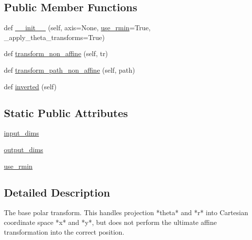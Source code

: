 \subsection*{Public Member Functions}
\begin{DoxyCompactItemize}
\item 
def \hyperlink{classmatplotlib_1_1projections_1_1polar_1_1PolarTransform_aefebf19fe00b3fc0c0427c3a461b0e89}{\+\_\+\+\_\+init\+\_\+\+\_\+} (self, axis=None, \hyperlink{classmatplotlib_1_1projections_1_1polar_1_1PolarTransform_a394db95f80978aa081144a099f5eee55}{use\+\_\+rmin}=True, \+\_\+apply\+\_\+theta\+\_\+transforms=True)
\item 
def \hyperlink{classmatplotlib_1_1projections_1_1polar_1_1PolarTransform_a607b1522b3bac728ef34deac37bd6f6f}{transform\+\_\+non\+\_\+affine} (self, tr)
\item 
def \hyperlink{classmatplotlib_1_1projections_1_1polar_1_1PolarTransform_ae08b51c7a1dd301f6a3fdc414a264fb2}{transform\+\_\+path\+\_\+non\+\_\+affine} (self, path)
\item 
def \hyperlink{classmatplotlib_1_1projections_1_1polar_1_1PolarTransform_ac827736814cd2af18bf288eca974f13b}{inverted} (self)
\end{DoxyCompactItemize}
\subsection*{Static Public Attributes}
\begin{DoxyCompactItemize}
\item 
\hyperlink{classmatplotlib_1_1projections_1_1polar_1_1PolarTransform_a9a8cf1e3380a55e75b16abc5be02a1b7}{input\+\_\+dims}
\item 
\hyperlink{classmatplotlib_1_1projections_1_1polar_1_1PolarTransform_a6fba9e3627aeabf0cbdbceb4356b74f2}{output\+\_\+dims}
\item 
\hyperlink{classmatplotlib_1_1projections_1_1polar_1_1PolarTransform_a394db95f80978aa081144a099f5eee55}{use\+\_\+rmin}
\end{DoxyCompactItemize}


\subsection{Detailed Description}
\begin{DoxyVerb}The base polar transform.  This handles projection *theta* and
*r* into Cartesian coordinate space *x* and *y*, but does not
perform the ultimate affine transformation into the correct
position.
\end{DoxyVerb}
 


